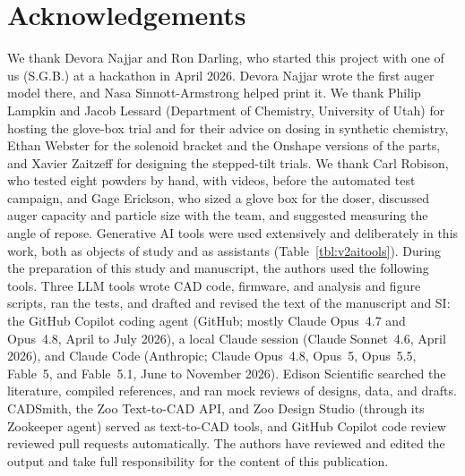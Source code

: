 \documentclass[twoside,twocolumn,9pt]{article}
\begin{document}
\section*{Acknowledgements}
We thank Devora Najjar and Ron Darling, who started this project with one of us (S.G.B.) at a hackathon in April 2026. Devora Najjar wrote the first auger model there, and Nasa Sinnott-Armstrong helped print it. We thank Philip Lampkin and Jacob Lessard (Department of Chemistry, University of Utah) for hosting the glove-box trial and for their advice on dosing in synthetic chemistry, Ethan Webster for the solenoid bracket and the Onshape versions of the parts, and Xavier Zaitzeff for designing the stepped-tilt trials. We thank Carl Robison, who tested eight powders by hand, with videos, before the automated test campaign, and Gage Erickson, who sized a glove box for the doser, discussed auger capacity and particle size with the team, and suggested measuring the angle of repose. Generative AI tools were used extensively and deliberately in this work, both as objects of study and as assistants (Table~\ref{tbl:v2aitools}). During the preparation of this study and manuscript, the authors used the following tools. Three LLM tools wrote CAD code, firmware, and analysis and figure scripts, ran the tests, and drafted and revised the text of the manuscript and SI: the GitHub Copilot coding agent (GitHub; mostly Claude Opus~4.7 and Opus~4.8, April to July 2026), a local Claude session (Claude Sonnet~4.6, April 2026), and Claude Code (Anthropic; Claude Opus~4.8, Opus~5, Opus~5.5, Fable~5, and Fable~5.1, June to November 2026). Edison Scientific searched the literature, compiled references, and ran mock reviews of designs, data, and drafts. CADSmith, the Zoo Text-to-CAD API, and Zoo Design Studio (through its Zookeeper agent) served as text-to-CAD tools, and GitHub Copilot code review reviewed pull requests automatically. The authors have reviewed and edited the output and take full responsibility for the content of this publication.

\balance

\renewcommand\refname{Notes and references}



\end{document}
